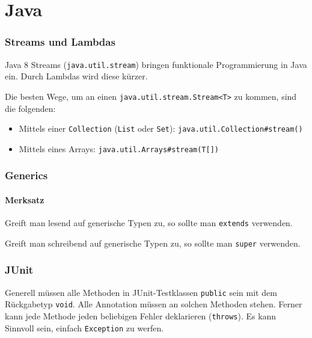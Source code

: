 



\chapter{Java}
\subsection{Streams und Lambdas}
Java 8 Streams (\texttt{java.util.stream}) bringen funktionale Programmierung in Java ein. Durch Lambdas wird diese kürzer.

Die besten Wege, um an einen \texttt{java.util.stream.Stream<T>} zu kommen, sind die folgenden:
\begin{itemize}
	\item Mittels einer \texttt{Collection} (\texttt{List} oder \texttt{Set}): \texttt{java.util.Collection\#stream()}
	\item Mittels eines Arrays: \texttt{java.util.Arrays\#stream(T[])}
\end{itemize}



\subsection{Generics}
\subsubsection{Merksatz}
Greift man lesend auf generische Typen zu, so sollte man \texttt{extends} verwenden.

\noindent Greift man schreibend auf generische Typen zu, so sollte man \texttt{super} verwenden.



\subsection{JUnit}
Generell müssen alle Methoden in JUnit-Testklassen \texttt{public} sein mit dem Rückgabetyp \texttt{void}. Alle Annotation müssen an solchen Methoden stehen. Ferner kann jede Methode jeden beliebigen Fehler deklarieren (\texttt{throws}). Es kann Sinnvoll sein, einfach \texttt{Exception} zu werfen.

